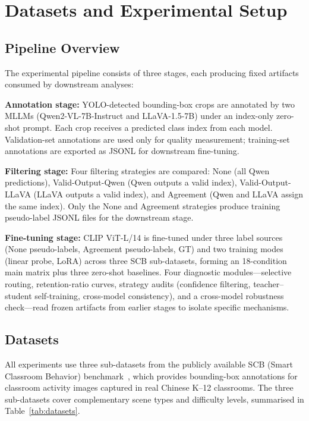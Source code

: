 \documentclass{ieeeaccess}
\begin{document}
\section{Datasets and Experimental Setup}
\label{sec:method}

\subsection{Pipeline Overview}

The experimental pipeline consists of three stages, each producing
fixed artifacts consumed by downstream analyses:

\noindent\textbf{Annotation stage:} YOLO-detected bounding-box crops are
annotated by two MLLMs (Qwen2-VL-7B-Instruct and LLaVA-1.5-7B) under an
index-only zero-shot prompt. Each crop receives a predicted class index
from each model. Validation-set annotations are used only for quality
measurement; training-set annotations are exported as JSONL for
downstream fine-tuning.

\noindent\textbf{Filtering stage:} Four filtering strategies are compared:
None (all Qwen predictions), Valid-Output-Qwen (Qwen outputs a valid
index), Valid-Output-LLaVA (LLaVA outputs a valid index), and Agreement
(Qwen and LLaVA assign the same index). Only the None and Agreement
strategies produce training pseudo-label JSONL files for the downstream
stage.

\noindent\textbf{Fine-tuning stage:} CLIP ViT-L/14 is fine-tuned under
three label sources (None pseudo-labels, Agreement pseudo-labels, GT)
and two training modes (linear probe, LoRA) across three SCB
sub-datasets, forming an 18-condition main matrix plus three
zero-shot baselines. Four diagnostic modules---selective routing,
retention-ratio curves, strategy audits (confidence filtering,
teacher--student self-training, cross-model consistency), and a
cross-model robustness check---read frozen artifacts from
earlier stages to isolate specific mechanisms.

\subsection{Datasets}
\label{sec:datasets}

All experiments use three sub-datasets from the publicly available
SCB (Smart Classroom Behavior) benchmark~\cite{scb_dataset}, which
provides bounding-box annotations for classroom activity images
captured in real Chinese K--12 classrooms.
The three sub-datasets cover complementary scene types and difficulty
levels, summarised in Table~\ref{tab:datasets}.
\end{document}
